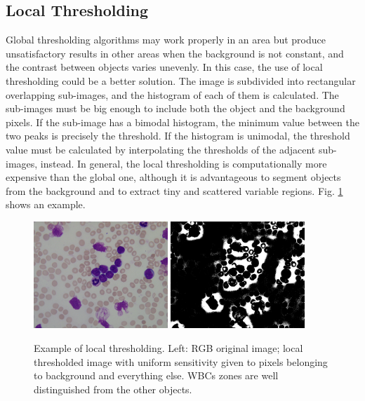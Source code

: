 \subsection{Local Thresholding} \label{LT} %
Global thresholding algorithms may work properly in an area but produce unsatisfactory results in other areas when the background is not constant, and the contrast between objects varies unevenly. In this case, the use of local thresholding could be a better solution. The image is subdivided into rectangular overlapping sub-images, and the histogram of each of them is calculated. The sub-images must be big enough to include both the object and the background pixels. If the sub-image has a bimodal histogram, the minimum value between the two peaks is precisely the threshold. If the histogram is unimodal, the threshold value must be calculated by interpolating the thresholds of the adjacent sub-images, instead. In general, the local thresholding is computationally more expensive than the global one, although it is advantageous to segment objects from the background and to extract tiny and scattered variable regions. Fig. \ref{fig:localT} shows an example.

\begin{figure}[h]
	\centering
	\includegraphics[width=0.45\textwidth]{images/figcs_rgb}
	\includegraphics[width=0.45\textwidth]{images/fig_localT}
	\caption[Example of local thresholding.]{\label{fig:localT}Example of local thresholding. Left: RGB original image; local thresholded image with uniform sensitivity given to pixels belonging to background and everything else. WBCs zones are well distinguished from the other objects.}
\end{figure}

